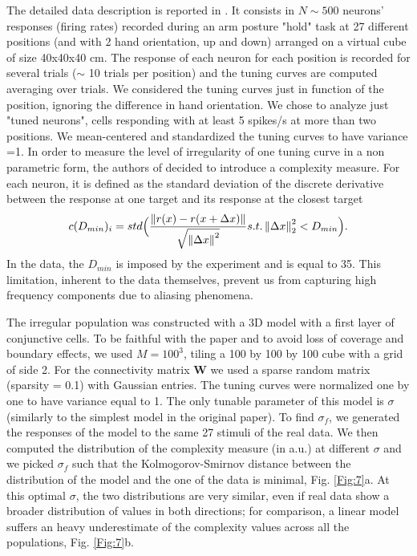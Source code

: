 \documentclass[a4paper]{article}%
\begin{document}
The detailed data description is reported in
\cite{Lalazar2016TuningConnectivity}. It consists in $N\sim500$ neurons'
responses (firing rates) recorded during an arm posture "hold" task at 27
different positions (and with 2 hand orientation, up and down) arranged on a
virtual cube of size 40x40x40 cm. The response of each neuron for each
position is recorded for several trials ($\sim$ 10 trials per position) and
the tuning curves are computed averaging over trials. We considered the tuning
curves just in function of the position, ignoring the difference in hand
orientation. We chose to analyze just "tuned neurons", cells responding with
at least 5 spikes/s at more than two positions. We mean-centered and
standardized the tuning curves to have variance =1. In order to measure the
level of irregularity of one tuning curve in a non parametric form, the
authors of \cite{Lalazar2016TuningConnectivity} decided to introduce a
complexity measure. For each neuron, it is defined as the standard deviation
of the discrete derivative between the response at one target and its response
at the closest target
\begin{equation}
c(D_{min})_{i} = std\Bigl(\frac{\left\|  r(x) - r(x+\Delta x)\right\|  }%
{\sqrt{\left\|  \Delta x\right\|  ^{2}}} s.t. \left\|  \Delta x\right\|
_{2}^{2} < D_{min}\Bigr).
\end{equation}
In the data, the $D_{min}$ is imposed by the experiment and is equal to 35.
This limitation, inherent to the data themselves, prevent us from capturing
high frequency components due to aliasing phenomena.

The irregular population was constructed with a 3D model with a first layer of
conjunctive cells. To be faithful with the paper and to avoid loss of coverage
and boundary effects, we used $M= 100^{3}$, tiling a 100 by 100 by 100 cube
with a grid of side 2. For the connectivity matrix $\mathbf{W}$ we used a
sparse random matrix (sparsity = 0.1) with Gaussian entries. The tuning curves
were normalized one by one to have variance equal to 1. The only tunable
parameter of this model is $\sigma$ (similarly to the simplest model in the
original paper). To find $\sigma_{f}$, we generated the responses of the model
to the same 27 stimuli of the real data. We then computed the distribution of
the complexity measure (in a.u.) at different $\sigma$ and we picked
$\sigma_{f}$ such that the Kolmogorov-Smirnov distance between the
distribution of the model and the one of the data is minimal, Fig.
\ref{Fig:7}a. At this optimal $\sigma$, the two distributions are very
similar, even if real data show a broader distribution of values in both
directions; for comparison, a linear model suffers an heavy underestimate of
the complexity values across all the populations, Fig. \ref{Fig:7}b.
\end{document}
